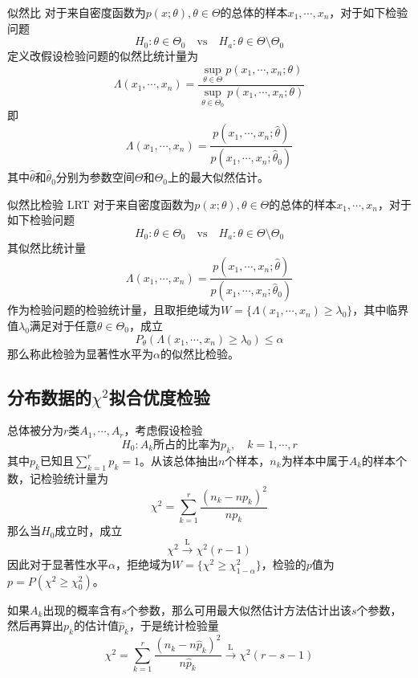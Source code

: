 \documentclass[lang = cn, scheme = chinese, thmcnt = section]{elegantbook}
\begin{document}
\begin{definition}{似然比}
	对于来自密度函数为$p(x;\theta),\theta\in\Theta$的总体的样本$x_1,\cdots,x_n$，对于如下检验问题
	$$
	H_0:\theta\in\Theta_0\quad \mathrm{vs}\quad H_a:\theta\in\Theta\setminus\Theta_0
	$$
	定义改假设检验问题的似然比统计量为
	$$
	\Lambda(x_1,\cdots,x_n)=\frac{\sup_{\theta\in\Theta}{p(x_1,\cdots,x_n;\theta)}}{\sup_{\theta\in\Theta_0}{p(x_1,\cdots,x_n;\theta)}}
	$$
	即
	$$
	\Lambda(x_1,\cdots,x_n)=\frac{p(x_1,\cdots,x_n;\hat{\theta})}{p(x_1,\cdots,x_n;\hat{\theta}_0)}
	$$
	其中$\hat{\theta}$和$\hat{\theta}_0$分别为参数空间$\Theta$和$\Theta_0$上的最大似然估计。
\end{definition}

\begin{definition}{似然比检验 LRT}
	对于来自密度函数为$p(x;\theta),\theta\in\Theta$的总体的样本$x_1,\cdots,x_n$，对于如下检验问题
	$$
	H_0:\theta\in\Theta_0\quad \mathrm{vs}\quad H_a:\theta\in\Theta\setminus\Theta_0
	$$
	其似然比统计量
	$$
	\Lambda(x_1,\cdots,x_n)=\frac{p(x_1,\cdots,x_n;\hat{\theta})}{p(x_1,\cdots,x_n;\hat{\theta}_0)}
	$$
	作为检验问题的检验统计量，且取拒绝域为$W=\{ \Lambda(x_1,\cdots,x_n)\ge \lambda_0 \}$，其中临界值$\lambda_0$满足对于任意$\theta\in\Theta_0$，成立
	$$
	P_\theta(\Lambda(x_1,\cdots,x_n)\ge \lambda_0)\le \alpha
	$$
	那么称此检验为显著性水平为$\alpha$的似然比检验。
\end{definition}

\subsection{分布数据的$\chi^2$拟合优度检验}

\begin{theorem}
	总体被分为$r$类$A_1,\cdots,A_r$，考虑假设检验
	$$
	H_0:A_k\text{所占的比率为}p_k,\quad k=1,\cdots,r
	$$
	其中$p_k$已知且$\sum_{k=1}^{r}{p_k}=1$。从该总体抽出$n$个样本，$n_k$为样本中属于$A_k$的样本个数，记检验统计量为
	$$
	\chi^2=\sum_{k=1}^{r}\frac{(n_k-np_k)^2}{np_k}
	$$
	那么当$H_0$成立时，成立
	$$
	\chi^2\xrightarrow{\mathrm{L}}\chi^2(r-1)
	$$
	因此对于显著性水平$\alpha$，拒绝域为$W=\{ \chi^2\ge\chi^2_{1-\alpha} \}$，检验的$p$值为$p=P(\chi^2\ge\chi^2_0)$。
	
	如果$A_k$出现的概率含有$s$个参数，那么可用最大似然估计方法估计出该$s$个参数，然后再算出$p_k$的估计值$\hat{p}_k$，于是统计检验量
	$$
	\chi^2=\sum_{k=1}^{r}\frac{(n_k-n\hat{p}_k)^2}{n\hat{p}_k}\xrightarrow{\mathrm{L}}\chi^2(r-s-1)
	$$
\end{theorem}
\end{document}
